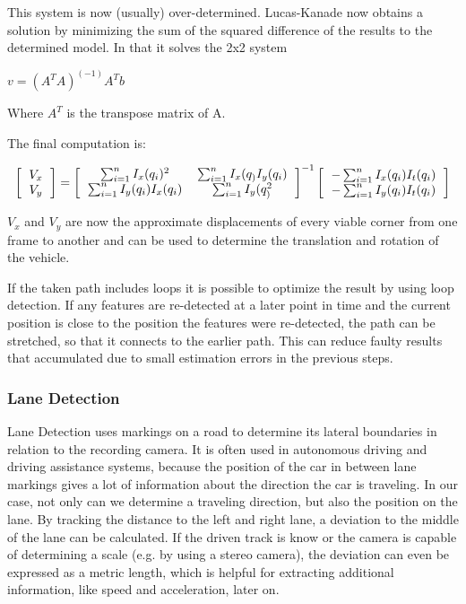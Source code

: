 This system is now (usually) over-determined. Lucas-Kanade now obtains a solution by minimizing the sum of the squared difference of the results to the determined model.
In that it solves the 2x2 system

	$v = (A^T A)^(-1) A^T b$

Where $A^T$ is the transpose matrix of A.

The final computation is:

\[
\left[
\begin{tabular}{c}
	$V_x$ \\
	$V_y$
\end{tabular}
\right]
= 
\left[
\begin{tabular}{cc}
	$\sum_{i = 1}^n I_x(q_i)^2$ & $\sum_{i = 1}^n I_x(q_) I_y(q_i)$ \\
	$\sum_{i = 1}^n I_y(q_i) I_x(q_i)$ & $\sum_{i = 1}^n I_y(q_)^2$
\end{tabular}
\right]
^{-1}
\left[
\begin{tabular}{c}
	$- \sum_{i = 1}^n I_x(q_i) I_t(q_i)$ \\
	$- \sum_{i = 1}^n I_y(q_i) I_t(q_i)$ 
\end{tabular}
\right]
\]

$V_x$ and $V_y$ are now the approximate displacements of every viable corner from one frame to another and can be used to determine the translation and rotation of the vehicle.

If the taken path includes loops it is possible to optimize the result by using loop detection. If any features are re-detected at a later point in time and the current position is close to the position the features were re-detected, the path can be stretched, so that it connects to the earlier path.
This can reduce faulty results that accumulated due to small estimation errors in the previous steps.


\subsubsection{Lane Detection}
Lane Detection uses markings on a road to determine its lateral boundaries in relation to the recording camera. It is often used in autonomous driving and driving assistance systems, because the position of the car in between lane markings gives a lot of information about the direction the car is traveling. 
In our case, not only can we determine a traveling direction, but also the position on the lane.
By tracking the distance to the left and right lane, a deviation to the middle of the lane can be calculated. 
If the driven track is know or the camera is capable of determining a scale (e.g. by using a stereo camera), the deviation can even be expressed as a metric length, which is helpful for extracting additional information, like speed and acceleration, later on.


